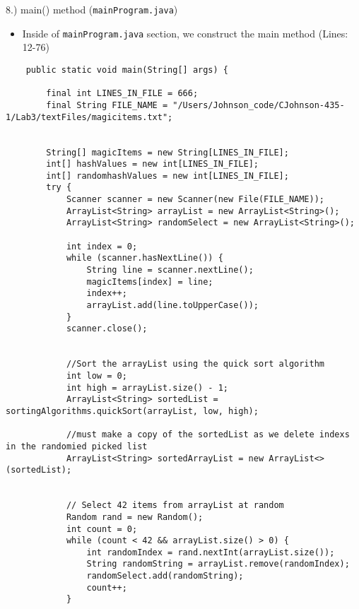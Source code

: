 \documentclass{article}
\begin{document}
\pagebreak
\begin{large}
    8.) main() method (\verb|mainProgram.java|)
\end{large}

\begin{itemize}

\item Inside of \verb|mainProgram.java| section, we construct the main method (Lines: 12-76)

\end{itemize}

\begin{verbatim}
    public static void main(String[] args) {
    
        final int LINES_IN_FILE = 666;
        final String FILE_NAME = "/Users/Johnson_code/CJohnson-435-1/Lab3/textFiles/magicitems.txt";
        
        
        String[] magicItems = new String[LINES_IN_FILE];
        int[] hashValues = new int[LINES_IN_FILE];
        int[] randomhashValues = new int[LINES_IN_FILE];
        try {
            Scanner scanner = new Scanner(new File(FILE_NAME));
            ArrayList<String> arrayList = new ArrayList<String>();
            ArrayList<String> randomSelect = new ArrayList<String>();
            
            int index = 0;
            while (scanner.hasNextLine()) {
                String line = scanner.nextLine();
                magicItems[index] = line;
                index++;
                arrayList.add(line.toUpperCase());
            }
            scanner.close();
            
            
            //Sort the arrayList using the quick sort algorithm
            int low = 0;
            int high = arrayList.size() - 1;
            ArrayList<String> sortedList = sortingAlgorithms.quickSort(arrayList, low, high);
            
            //must make a copy of the sortedList as we delete indexs in the randomied picked list
            ArrayList<String> sortedArrayList = new ArrayList<>(sortedList);
            
            
            // Select 42 items from arrayList at random
            Random rand = new Random();
            int count = 0;
            while (count < 42 && arrayList.size() > 0) {
                int randomIndex = rand.nextInt(arrayList.size());
                String randomString = arrayList.remove(randomIndex);
                randomSelect.add(randomString);
                count++;
            }
            

\end{verbatim}
\end{document}
